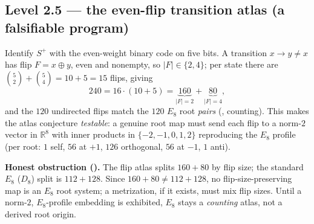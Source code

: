 \documentclass[11pt,a4paper]{article}
\theoremstyle{definition}
\begin{document}
\subsection{Level 2.5 --- the even-flip transition atlas (a falsifiable program)}
Identify $S^+$ with the even-weight binary code on five bits. A transition $x\to y\neq x$ has flip
$F=x\oplus y$, even and nonempty, so $|F|\in\{2,4\}$; per state there are
$\binom52+\binom54=10+5=15$ flips, giving
\begin{equation}
  240=16\cdot(10+5)=\underbrace{160}_{|F|=2}+\underbrace{80}_{|F|=4},
\end{equation}
and the $120$ undirected flips match the $120$ $E_8$ root \emph{pairs} (\mE, counting). This makes the
atlas conjecture \emph{testable}: a genuine root map must send each flip to a norm-$2$ vector in
$\mathbb R^8$ with inner products in $\{-2,-1,0,1,2\}$ reproducing the $E_8$ profile (per root:
$1$ self, $56$ at $+1$, $126$ orthogonal, $56$ at $-1$, $1$ anti).
\par\smallskip\noindent\textbf{Honest obstruction (\mO).}
The flip atlas splits $160+80$ by flip size; the standard $E_8$ ($D_8$) split is $112+128$. Since
$160+80\neq112+128$, no flip-size-preserving map is an $E_8$ root system; a metrization, if it
exists, must mix flip sizes. Until a norm-$2$, $E_8$-profile embedding is exhibited, $E_8$ stays a
\emph{counting} atlas, not a derived root origin.
\par\smallskip
\end{document}
